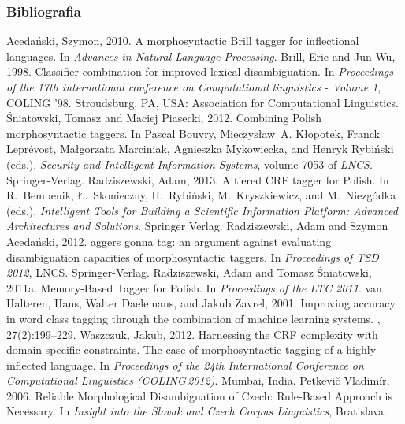 \documentclass[xcolor=dvipsnames,polish]{beamer}
\begin{document}
\begin{frame}[allowframebreaks]
  \frametitle{Bibliografia}
  \begin{thebibliography}{10}
  \beamertemplatebookbibitems
Acedański, Szymon, 2010.
\newblock A morphosyntactic {B}rill tagger for inflectional languages.
\newblock In {\em Advances in Natural Language Processing\/}.
  \beamertemplatearticlebibitems
Brill, Eric and Jun Wu, 1998.
\newblock Classifier combination for improved lexical disambiguation.
\newblock In {\em Proceedings of the 17th international conference on
  Computational linguistics - Volume 1\/}, COLING '98. Stroudsburg, PA, USA:
  Association for Computational Linguistics.
  \beamertemplatearticlebibitems
Śniatowski, Tomasz and Maciej Piasecki, 2012.
\newblock Combining {P}olish morphosyntactic taggers.
\newblock In Pascal Bouvry, Mieczysław~A. Kłopotek, Franck Leprévost,
  Małgorzata Marciniak, Agnieszka Mykowiecka, and Henryk Rybiński (eds.),
  {\em Security and Intelligent Information Systems\/}, volume 7053 of {\em
  LNCS\/}. Springer-Verlag.
  \beamertemplatearticlebibitems
Radziszewski, Adam, 2013.
\newblock A tiered {CRF} tagger for {P}olish.
\newblock In R.~Bembenik, {\L}.~Skonieczny, H.~Rybi\'{n}ski, M.~Kryszkiewicz,
  and M.~Niezg{\'o}dka (eds.), {\em Intelligent Tools for Building a Scientific
  Information Platform: Advanced Architectures and Solutions\/}. Springer
  Verlag.
  \beamertemplatearticlebibitems
Radziszewski, Adam and Szymon Acedański, 2012.
aggers gonna tag: an argument against evaluating disambiguation
  capacities of morphosyntactic taggers.
\newblock In {\em Proceedings of TSD 2012\/}, LNCS. Springer-Verlag.
\beamertemplatearticlebibitems
{}
Radziszewski, Adam and Tomasz Śniatowski, 2011a.
 {M}emory-{B}ased {T}agger for {P}olish.
\newblock In {\em Proceedings of the LTC 2011\/}.
\beamertemplatearticlebibitems
{}
van Halteren, Hans, Walter Daelemans, and Jakub Zavrel, 2001.
\newblock Improving accuracy in word class tagging through the combination of
  machine learning systems.
, 27(2):199--229.
\beamertemplatearticlebibitems
{}
Waszczuk, Jakub, 2012.
\newblock Harnessing the {CRF} complexity with domain-specific constraints.
  {T}he case of morphosyntactic tagging of a highly inflected language.
\newblock In {\em Proceedings of the 24th International Conference on
  Computational Linguistics ({COLING}\,2012)\/}. Mumbai, India.
\beamertemplatearticlebibitems
{}
Petkevič Vladimír, 2006.
\newblock Reliable {M}orphological {D}isambiguation of {C}zech: {R}ule-{B}ased {A}pproach is {N}ecessary. 
\newblock In {\em Insight into the Slovak and Czech Corpus Linguistics}, Bratislava.


\end{thebibliography}
\end{frame}
\end{document}
